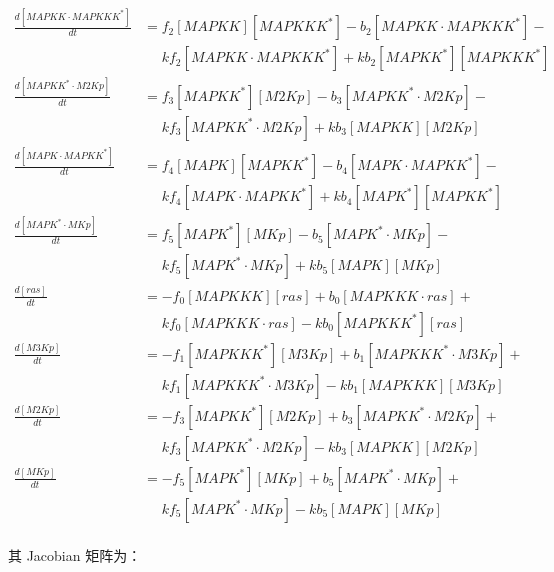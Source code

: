 \begin{equation*}
\begin{align*}
    \frac{d[MAPKK\cdot{}MAPKKK^{*}]}{dt} &= f_{2}[MAPKK][MAPKKK^{*}] - b_{2}[MAPKK\cdot{}MAPKKK^{*}] -\\
    &\phantom{=} kf_{2}[MAPKK\cdot{}MAPKKK^{*}] + kb_{2}[MAPKK^{*}][MAPKKK^{*}]\\
    \frac{d[MAPKK^{*}\cdot{}M2Kp]}{dt} &= f_{3}[MAPKK^{*}][M2Kp] - b_{3}[MAPKK^{*}\cdot{}M2Kp] -\\
    &\phantom{=} kf_{3}[MAPKK^{*}\cdot{}M2Kp] + kb_{3}[MAPKK][M2Kp]\\
    \frac{d[MAPK\cdot{}MAPKK^{*}]}{dt} &= f_{4}[MAPK][MAPKK^{*}] - b_{4}[MAPK\cdot{}MAPKK^{*}] -\\
    &\phantom{=} kf_{4}[MAPK\cdot{}MAPKK^{*}] + kb_{4}[MAPK^{*}][MAPKK^{*}]\\
    \frac{d[MAPK^{*}\cdot{}MKp]}{dt} &= f_{5}[MAPK^{*}][MKp] - b_{5}[MAPK^{*}\cdot{}MKp] -\\
    &\phantom{=} kf_{5}[MAPK^{*}\cdot{}MKp] + kb_{5}[MAPK][MKp]\\
    \frac{d[ras]}{dt} &= -f_{0}[MAPKKK][ras] + b_{0}[MAPKKK\cdot{}ras] +\\
    &\phantom{=} kf_{0}[MAPKKK\cdot{}ras] - kb_{0}[MAPKKK^{*}][ras]\\
    \frac{d[M3Kp]}{dt} &= -f_{1}[MAPKKK^{*}][M3Kp] + b_{1}[MAPKKK^{*}\cdot{}M3Kp] +\\
    &\phantom{=} kf_{1}[MAPKKK^{*}\cdot{}M3Kp] - kb_{1}[MAPKKK][M3Kp]\\
    \frac{d[M2Kp]}{dt} &= -f_{3}[MAPKK^{*}][M2Kp] + b_{3}[MAPKK^{*}\cdot{}M2Kp] +\\
    &\phantom{=} kf_{3}[MAPKK^{*}\cdot{}M2Kp] - kb_{3}[MAPKK][M2Kp]\\
    \frac{d[MKp]}{dt} &= -f_{5}[MAPK^{*}][MKp] + b_{5}[MAPK^{*}\cdot{}MKp] +\\
    &\phantom{=} kf_{5}[MAPK^{*}\cdot{}MKp] - kb_{5}[MAPK][MKp]\\
  \end{align*}
\end{equation*}
\normalsize

其 Jacobian 矩阵为：

